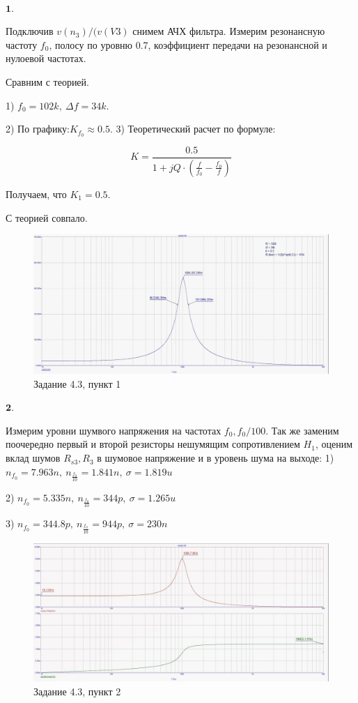 \documentclass[a4paper, 14pt]{extarticle}%
\begin{document}
$ $

$\textbf{1.} $

Подключив $v(n_3)/(v(V3)$ снимем АЧХ фильтра. Измерим резонансную частоту $f_0$, полосу по уровню 0.7, коэффициент передачи на резонансной и нулоевой частотах.

Сравним с теорией.

1) $f_0 = 102k, \: \Delta f = 34k$.

2) По графику:$K_{f_0} \approx 0.5$.
3) Теоретический расчет по формуле:

\[ K = \frac{0.5}{1 + jQ\cdot(\frac{f}{f_0} - \frac{f_0}{f})}\]

Получаем, что $K_1 = 0.5$.

С теорией совпало.

\begin{figure}[h!]
			\centering
			\includegraphics[width=1.1\linewidth]{4/4_3_2.jpg}
			\caption{Задание 4.3, пункт 1}
			\label{A}
\end{figure}


$\textbf{2.} $


Измерим уровни шумвого напряжения на частотах $f_0, f_0/100$. Так же заменим поочередно первый и второй резисторы нешумящим сопротивлением $H_1$, оценим вклад шумов $R_{s3}, R_3$ в шумовое напряжение и в уровень шума на выходе:
1) $n_{f_0} = 7.963n, \: n_{\frac{f_0}{10}} = 1.841n, \: \sigma = 1.819u$

2) $n_{f_0} = 5.335n, \: n_{\frac{f_0}{10}} = 344p, \: \sigma = 1.265u$

3) $n_{f_0} = 344.8p, \: n_{\frac{f_0}{10}} = 944p, \: \sigma = 230n$

\begin{figure}[h!]
			\centering
			\includegraphics[width=1.1\linewidth]{4/4_3_3.jpg}
			\caption{Задание 4.3, пункт 2}
			\label{A}
\end{figure}
\end{document}
